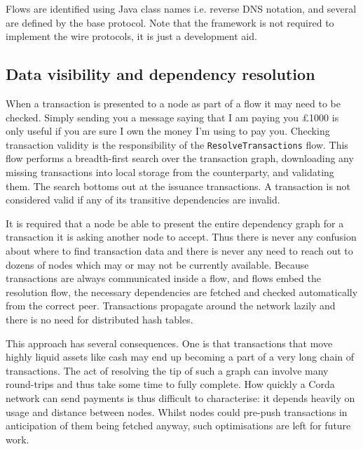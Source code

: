 \documentclass{article}
\begin{document}
Flows are identified using Java class names i.e. reverse DNS notation, and several are defined by the base
protocol. Note that the framework is not required to implement the wire protocols, it is just a development aid.


\subsection{Data visibility and dependency resolution}

When a transaction is presented to a node as part of a flow it may need to be checked. Simply sending you a message
saying that I am paying you \pounds1000 is only useful if you are sure I own the money I'm using to pay you.
Checking transaction validity is the responsibility of the \texttt{ResolveTransactions} flow. This flow performs a
breadth-first search over the transaction graph, downloading any missing transactions into local storage from the
counterparty, and validating them. The search bottoms out at the issuance transactions. A transaction is not
considered valid if any of its transitive dependencies are invalid.

It is required that a node be able to present the entire dependency graph for a transaction it is asking another
node to accept. Thus there is never any confusion about where to find transaction data and there is never any need
to reach out to dozens of nodes which may or may not be currently available. Because transactions are always
communicated inside a flow, and flows embed the resolution flow, the necessary dependencies are fetched and checked
automatically from the correct peer. Transactions propagate around the network lazily and there is no need for
distributed hash tables.

This approach has several consequences. One is that transactions that move highly liquid assets like cash may end
up becoming a part of a very long chain of transactions. The act of resolving the tip of such a graph can involve
many round-trips and thus take some time to fully complete. How quickly a Corda network can send payments is thus
difficult to characterise: it depends heavily on usage and distance between nodes. Whilst nodes could pre-push
transactions in anticipation of them being fetched anyway, such optimisations are left for future work.
\end{document}
